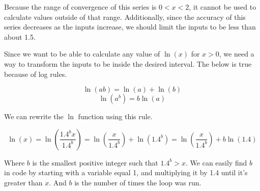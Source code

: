 \documentclass[12pt, letterpaper]{article}
\begin{document}
Because the range of convergence of this series is $0<x<2$, it cannot be used to calculate values outside of that range. Additionally, since the accuracy of this series decreases as the inputs increase, we should limit the inputs to be less than about 1.5.

\begin{center}
\end{center}

Since we want to be able to calculate any value of $\ln(x)$ for $x>0$, we need a way to transform the inputs to be inside the desired interval. The below is true because of log rules.

\[ \ln(ab) = \ln(a) + \ln(b) \]
\[ \ln(a^b) = b\ln(a) \]

We can rewrite the $\ln$ function using this rule.

\[ \ln(x) = \ln\left(\frac{1.4^bx}{1.4^b}\right) = \ln\left(\frac{x}{1.4^b}\right) + \ln\left(1.4^b\right) = \ln\left(\frac{x}{1.4^b}\right) + b\ln\left(1.4\right) \]

Where $b$ is the smallest positive integer such that $1.4^b>x$. We can easily find $b$ in code by starting with a variable equal 1, and multiplying it by 1.4 until it's greater than $x$. And $b$ is the number of times the loop was run.

\end{document}
